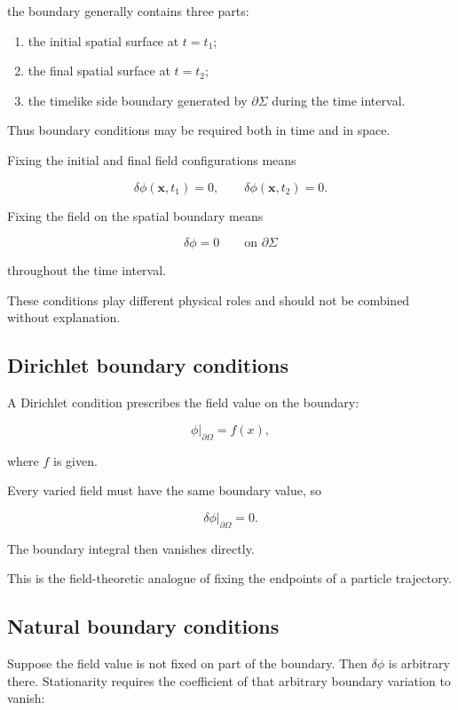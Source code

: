 the boundary generally contains three parts:

\begin{enumerate}
    \item the initial spatial surface at \(t=t_{1}\);
    \item the final spatial surface at \(t=t_{2}\);
    \item the timelike side boundary generated by \(\partial\Sigma\) during the time interval.
\end{enumerate}

Thus boundary conditions may be required both in time and in space.

Fixing the initial and final field configurations means

\[
\delta\phi(\mathbf{x},t_{1})=0,
\qquad
\delta\phi(\mathbf{x},t_{2})=0.
\]

Fixing the field on the spatial boundary means

\[
\delta\phi=0
\qquad
\text{on }\partial\Sigma
\]

throughout the time interval.

These conditions play different physical roles and should not be combined without explanation.

\subsection{Dirichlet boundary conditions}

A Dirichlet condition prescribes the field value on the boundary:

\[
\phi|_{\partial\Omega}
=
f(x),
\]

where \(f\) is given.

Every varied field must have the same boundary value, so

\[
\boxed{
\delta\phi|_{\partial\Omega}=0
}.
\]

The boundary integral then vanishes directly.

This is the field-theoretic analogue of fixing the endpoints of a particle trajectory.

\subsection{Natural boundary conditions}

Suppose the field value is not fixed on part of the boundary. Then \(\delta\phi\) is arbitrary there. Stationarity requires the coefficient of that arbitrary boundary variation to vanish:


